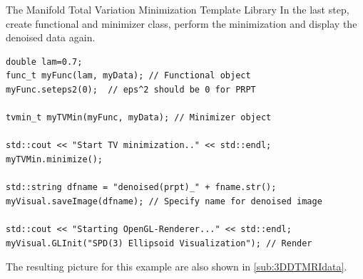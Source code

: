 \begin{chapter}{The Manifold Total Variation Minimization Template Library}
In the last step, create functional and minimizer class, perform the minimization and display the denoised data again.

\cppinline
\begin{lstlisting}[label=code:tut3_rendernoisyimg,caption={Minimization and final rendering}]
double lam=0.7;
func_t myFunc(lam, myData); // Functional object
myFunc.seteps2(0);  // eps^2 should be 0 for PRPT

tvmin_t myTVMin(myFunc, myData); // Minimizer object

std::cout << "Start TV minimization.." << std::endl;
myTVMin.minimize();

std::string dfname = "denoised(prpt)_" + fname.str();
myVisual.saveImage(dfname); // Specify name for denoised image

std::cout << "Starting OpenGL-Renderer..." << std::endl;
myVisual.GLInit("SPD(3) Ellipsoid Visualization"); // Render
\end{lstlisting}

The resulting picture for this example are also shown in \ref{sub:3DDTMRIdata}.







\end{chapter}
